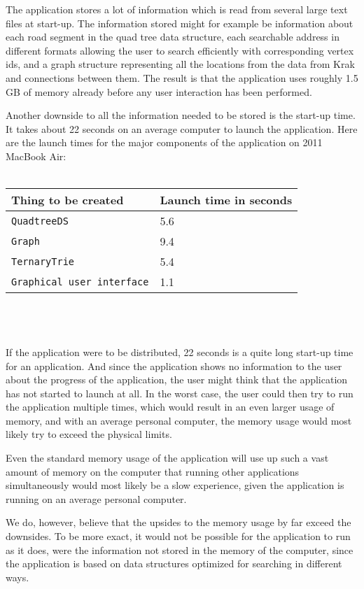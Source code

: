 The application stores a lot of information which is read from several large text files at start-up. The information stored might for example be information about each road segment in the quad tree data structure, each searchable address in different formats allowing the user to search efficiently with corresponding vertex ids, and a graph structure representing all the locations from the data from Krak and connections between them. The result is that the application uses roughly 1.5 GB of memory already before any user interaction has been performed.

Another downside to all the information needed to be stored is the start-up time. It takes about 22 seconds on an average computer to launch the application. Here are the launch times for the major components of the application on 2011 MacBook Air: \\ \\
\begin{tabular}{ p{5cm} | p{3cm} }
	\textbf{Thing to be created} & \textbf{Launch time in seconds} \\
	\hline
	\texttt{QuadtreeDS} & 5.6 \\
	\texttt{Graph} & 9.4 \\
	\texttt{TernaryTrie} & 5.4 \\
	\texttt{Graphical user interface} & 1.1
\end{tabular}
\\ \\ \\
If the application were to be distributed, 22 seconds is a quite long start-up time for an application. And since the application shows no information to the user about the progress of the application, the user might think that the application has not started to launch at all. In the worst case, the user could then try to run the application multiple times, which would result in an even larger usage of memory, and with an average personal computer, the memory usage would most likely try to exceed the physical limits.

Even the standard memory usage of the application will use up such a vast amount of memory on the computer that running other applications simultaneously would most likely be a slow experience, given the application is running on an average personal computer.

We do, however, believe that the upsides to the memory usage by far exceed the downsides. To be more exact, it would not be possible for the application to run as it does, were the information not stored in the memory of the computer, since the application is based on data structures optimized for searching in different ways.

